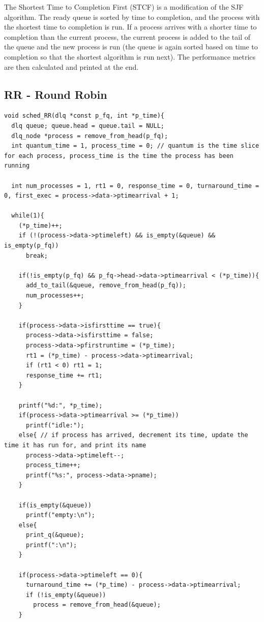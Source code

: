 \documentclass{article}
\theoremstyle{mytheoremstyle}
\theoremstyle{mytheoremstyle}
\theoremstyle{myproblemstyle}
\begin{document}
The Shortest Time to Completion First (STCF) is a modification of the SJF algorithm. The ready queue is sorted by time to completion, and the process with the shortest time to completion is run. If a process arrives with a shorter time to completion than the current process, the current process is added to the tail of the queue and the new process is run (the queue is again sorted based on time to completion so that the shortest algorithm is run next). The performance metrics are then calculated and printed at the end.

\pagebreak
\subsection{RR - Round Robin}
\begin{lstlisting}[caption={RR Scheduling Algorithm},label={lst:rr}]
void sched_RR(dlq *const p_fq, int *p_time){
  dlq queue; queue.head = queue.tail = NULL;
  dlq_node *process = remove_from_head(p_fq);
  int quantum_time = 1, process_time = 0; // quantum is the time slice for each process, process_time is the time the process has been running

  int num_processes = 1, rt1 = 0, response_time = 0, turnaround_time = 0, first_exec = process->data->ptimearrival + 1;

  while(1){
    (*p_time)++;
    if (!(process->data->ptimeleft) && is_empty(&queue) && is_empty(p_fq))
      break;

    if(!is_empty(p_fq) && p_fq->head->data->ptimearrival < (*p_time)){
      add_to_tail(&queue, remove_from_head(p_fq));
      num_processes++;
    }

    if(process->data->isfirsttime == true){
      process->data->isfirsttime = false;
      process->data->pfirstruntime = (*p_time);
      rt1 = (*p_time) - process->data->ptimearrival;
      if (rt1 < 0) rt1 = 1;
      response_time += rt1;
    }

    printf("%d:", *p_time);
    if(process->data->ptimearrival >= (*p_time))
      printf("idle:");
    else{ // if process has arrived, decrement its time, update the time it has run for, and print its name
      process->data->ptimeleft--;
      process_time++;
      printf("%s:", process->data->pname);
    }

    if(is_empty(&queue))
      printf("empty:\n");
    else{
      print_q(&queue);
      printf(":\n");
    }

    if(process->data->ptimeleft == 0){
      turnaround_time += (*p_time) - process->data->ptimearrival;
      if (!is_empty(&queue))
        process = remove_from_head(&queue);
    }


\end{lstlisting}
\end{document}

